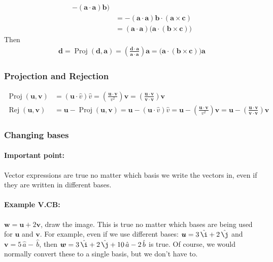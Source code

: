 \documentclass{article}
\renewcommand{\vec}[1]{\boldsymbol{#1}}
\newcommand{\unit}[1]{\,\hat{#1}}
\begin{document}
\begin{itemize}
\begin{align}
    - (\vec{a} \cdot \vec{a}) \vec{b} \big) \\
    &= - (\vec{a} \cdot \vec{a})
    \vec{b} \cdot (\vec{a} \times \vec{c}) \\
    &= (\vec{a} \cdot \vec{a})
    \big( \vec{a} \cdot (\vec{b} \times \vec{c}) \big)
  \end{align}
  Then
  \begin{align}
    \vec{d} = \operatorname{Proj}(\vec{d}, \vec{a})
    = \left(\frac{\vec{d} \cdot \vec{a}}{\vec{a} \cdot \vec{a}}\right)
    \vec{a}
    = \big( \vec{a} \cdot (\vec{b} \times \vec{c}) \big) \vec{a}
  \end{align}
\end{itemize}

\subsubsection{Projection and Rejection}

\begin{align}
  \operatorname{Proj}(\vec{u}, \vec{v})
  &= (\vec{u} \cdot \hat{v}) \hat{v}
  = \left(\frac{\vec{u} \cdot \vec{v}}{v^2}\right) \vec{v}
  = \left(\frac{\vec{u} \cdot \vec{v}}{\vec{v} \cdot \vec{v}}\right) \vec{v} \\
  \operatorname{Rej}(\vec{u}, \vec{v})
  &= \vec{u} - \operatorname{Proj}(\vec{u}, \vec{v})
  = \vec{u} - (\vec{u} \cdot \hat{v}) \hat{v}
  = \vec{u} - \left(\frac{\vec{u} \cdot \vec{v}}{v^2}\right) \vec{v}
  = \vec{u} - \left(\frac{\vec{u} \cdot \vec{v}}{\vec{v} \cdot \vec{v}}\right) \vec{v}
\end{align}

\subsubsection{Changing bases}

\paragraph{Important point:} Vector expressions are true no matter
which basis we write the vectors in, even if they are written in
different bases.

\paragraph{Example V.CB:} $\vec{w} = \vec{u} + 2 \vec{v}$, draw the
image. This is true no matter which bases are being used for $\vec{u}$
and $\vec{v}$. For example, even if we use different bases: $\vec{u} =
3\unit{\i} + 2\unit{\j}$ and $\vec{v} = 5\unit{a} - \unit{b}$, then $\vec{w} =
3\unit{\i} + 2\unit{\j} + 10\unit{a} - 2\unit{b}$ is true. Of course, we would
normally convert these to a single basis, but we don't have to.
\end{document}
